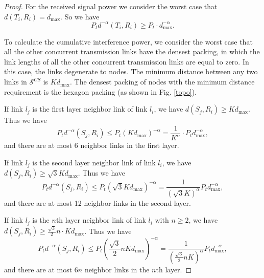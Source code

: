 \documentclass[conference]{IEEEtran}
\begin{document}
\begin{proof}
For the received signal power we consider the worst case that
$d(T_i,R_i)=d_{\max }$.  So we have
\begin{equation}
P_td^{ - \alpha }\left( {T_i ,R_i } \right)\geq P_t\cdot{d_{\max
}^{- \alpha }}.\label{sigP}
\end{equation}


To calculate the cumulative interference power, we consider the
worst case that all the other concurrent transmission links have the
densest packing, in which the link lengths of all the other
concurrent transmission links are equal to zero. In this case, the
links degenerate to nodes. The minimum distance between any two
links in $\mathcal{S}^{ CS}$ is $Kd_{\max }$. The densest packing of
nodes with the minimum distance requirement is the hexagon packing
(as shown in Fig. \ref{topo}).

If link $l_j$ is the f\/irst layer neighbor link of link $l_i$, we
have $d(S_j,R_i)\geq Kd_{\max }$. Thus we have
\begin{equation*}
{P_td^{ - \alpha }\left( {S_j ,R_i } \right)}  \leq
{P_t{\left(Kd_{\max }\right)}^{ - \alpha }}  =
\frac{1}{K^{\alpha}}\cdot P_t{d_{\max }^{- \alpha }},
\end{equation*}
and there are at most 6 neighbor links in the f\/irst layer.

If link $l_j$ is the second layer neighbor link of link $l_i$, we
have $d(S_j,R_i)\geq \sqrt{3} Kd_{\max }$. Thus we have
\begin{equation*}
{P_td^{ - \alpha }\left( {S_j ,R_i } \right)}  \leq
{P_t{\left(\sqrt{3} Kd_{\max }\right)}^{ - \alpha }}  =
\frac{1}{\left(\sqrt{3} K\right)^{\alpha}}  P_t{d_{\max }^{- \alpha
}},
\end{equation*}
and there are at most 12 neighbor links in the second layer.

If link $l_j$ is the $n$th layer neighbor link of link $l_i$ with
$n\geq 2$, we have $d(S_j,R_i)\geq \frac{\sqrt{3}}{2}n\cdot Kd_{\max
}$. Thus we have
\begin{equation*}
{P_td^{ - \alpha }\left( {S_j ,R_i } \right)}  \leq
{P_t{\left(\frac{\sqrt{3}}{2}n Kd_{\max }\right)}^{ - \alpha }}
=\frac{1}{\left(\frac{\sqrt{3}}{2}n K\right)^{\alpha}} P_t{d_{\max
}^{- \alpha }},
\end{equation*}
and there are at most $6n$ neighbor links in the $n$th layer.


\end{proof}
\end{document}
